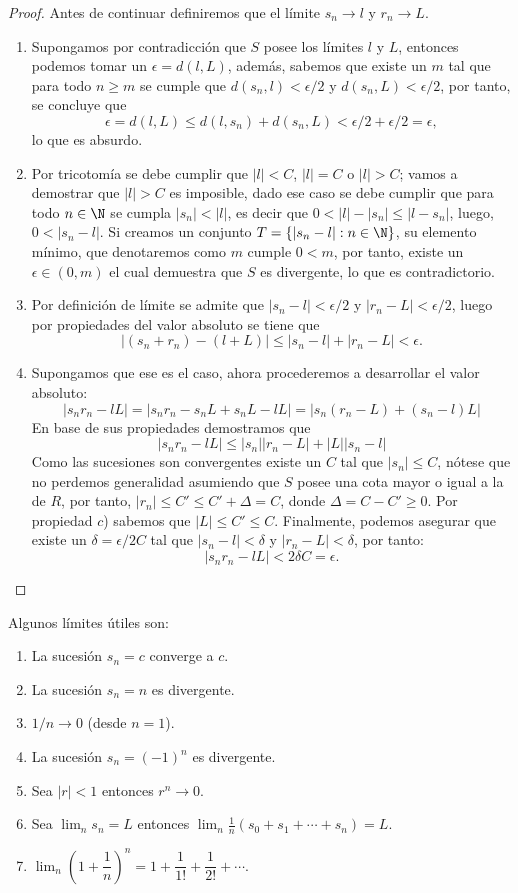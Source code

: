 \documentclass[11pt,oneside,a4paper]{book}
\begin{document}
\begin{proof}
Antes de continuar definiremos que el límite $s_n\to l$ y $r_n\to L$.
\begin{enumerate}[$a$)]
\item Supongamos por contradicción que $S$ posee los límites $l$ y $L$, entonces podemos tomar un $\epsilon=d(l,L)$, además, sabemos que existe un $m$ tal que para todo $n\geq m$ se cumple que $d(s_n,l)\lt\epsilon/2$ y $d(s_n,L)\lt\epsilon/2$, por tanto, se concluye que
$$\epsilon=d(l,L)\leq d(l,s_n)+d(s_n,L)\lt\epsilon/2+\epsilon/2=\epsilon,$$
lo que es absurdo.
\item Por tricotomía se debe cumplir que $|l|\lt C$, $|l|=C$ o $|l|\gt C$; vamos a demostrar que $|l|\gt C$ es imposible, dado ese caso se debe cumplir que para todo $n\in\N$ se cumpla $|s_n|\lt|l|$, es decir que $0\lt|l|-|s_n|\leq|l-s_n|$, luego, $0\lt|s_n-l|$. Si creamos un conjunto $T=\{|s_n-l|:n\in\N\}$, su elemento mínimo, que denotaremos como $m$ cumple $0\lt m$, por tanto, existe un $\epsilon\in(0,m)$ el cual demuestra que $S$ es divergente, lo que es contradictorio.
\item Por definición de límite se admite que $|s_n-l|\lt\epsilon/2$ y $|r_n-L|\lt\epsilon/2$, luego por propiedades del valor absoluto se tiene que
$$|(s_n+r_n)-(l+L)|\leq|s_n-l|+|r_n-L|\lt\epsilon.$$
\item Supongamos que ese es el caso, ahora procederemos a desarrollar el valor absoluto:
$$|s_nr_n-lL|=|s_nr_n-s_nL+s_nL-lL|=|s_n(r_n-L)+(s_n-l)L|$$
En base de sus propiedades demostramos que
$$|s_nr_n-lL|\leq|s_n||r_n-L|+|L||s_n-l|$$
Como las sucesiones son convergentes existe un $C$ tal que $|s_n|\leq C$, nótese que no perdemos generalidad asumiendo que $S$ posee una cota mayor o igual a la de $R$, por tanto, $|r_n|\leq C'\leq C'+\Delta=C$, donde $\Delta=C-C'\geq 0$. Por propiedad $c$) sabemos que $|L|\leq C'\leq C$. Finalmente, podemos asegurar que existe un $\delta=\epsilon/2C$ tal que $|s_n-l|\lt\delta$ y $|r_n-L|\lt\delta$, por tanto:
$$|s_nr_n-lL|\lt 2\delta C=\epsilon.$$
\end{enumerate}
\end{proof}
\begin{prop}
Algunos límites útiles son:
\begin{enumerate}[$a$)]
\item La sucesión $s_n=c$ converge a $c$.
\item La sucesión $s_n=n$ es divergente.
\item $1/n\to 0$ (desde $n=1$).
\item La sucesión $s_n=(-1)^n$ es divergente.
\item Sea $|r|\lt 1$ entonces $r^n\to 0$.
\item Sea $\lim_n s_n=L$ entonces $\lim_n\frac{1}{n}(s_0+s_1+\cdots+s_n)=L$.
\item $\lim_n \left(1+\dfrac{1}{n}\right)^n=1+\dfrac{1}{1!}+\dfrac{1}{2!}+\cdots$.
\end{enumerate}
\end{prop}
\end{document}
